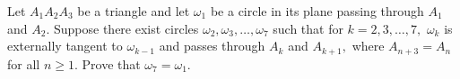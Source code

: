Let $A_1A_2A_3$ be a triangle and let $\omega_1$ be a circle in its plane passing through $A_1$ and $A_2.$ Suppose there exist circles $\omega_2, \omega_3, \dots, \omega_7$ such that for $k = 2, 3, \dots, 7,$ $\omega_k$ is externally tangent to $\omega_{k-1}$ and passes through $A_k$ and $A_{k+1},$  where $A_{n+3} = A_{n}$ for all $n \ge 1$. Prove that $\omega_7 = \omega_1.$